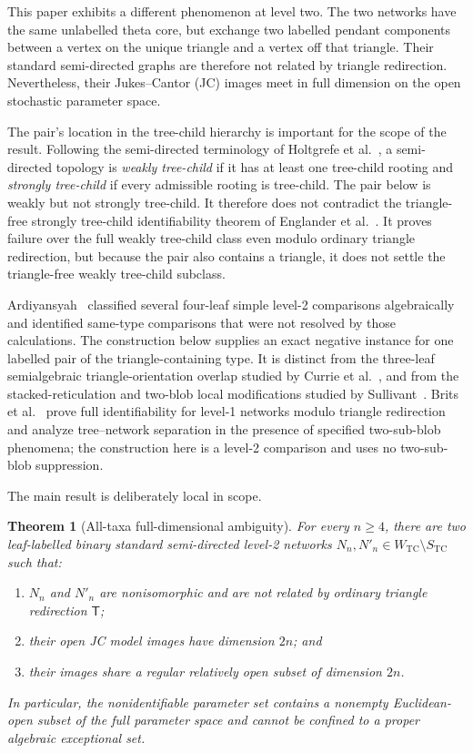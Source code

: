\documentclass[11pt]{article}
\newtheorem{theorem}{Theorem}[section]
\theoremstyle{remark}
\newcommand{\TCw}{W_{\mathrm{TC}}}
\newcommand{\TCs}{S_{\mathrm{TC}}}
\newcommand{\Tmove}{\mathsf T}
\begin{document}
This paper exhibits a different phenomenon at level two.  The two networks
have the same unlabelled theta core, but exchange two labelled pendant
components between a vertex on the unique triangle and a vertex off that
triangle.  Their standard semi-directed graphs are therefore not related by
triangle redirection.  Nevertheless, their Jukes--Cantor (JC) images meet in
full dimension on the open stochastic parameter space.

The pair's location in the tree-child hierarchy is important for the scope of
the result.  Following the semi-directed
terminology of Holtgrefe et al.~\cite{HoltgrefeEtAl2026}, a semi-directed
topology is \emph{weakly tree-child} if it has at least one tree-child rooting
and \emph{strongly tree-child} if every admissible rooting is tree-child.  The
pair below is weakly but not strongly tree-child.  It therefore does not
contradict the triangle-free strongly tree-child identifiability theorem of
Englander et al.~\cite{EnglanderEtAl2026}.  It proves failure over the full
weakly tree-child class even modulo ordinary triangle redirection, but because
the pair also contains a triangle, it does not settle the triangle-free weakly
tree-child subclass.

Ardiyansyah~\cite{Ardiyansyah2021} classified several four-leaf simple
level-2 comparisons algebraically and identified same-type comparisons that
were not resolved by those calculations.  The construction below supplies an
exact negative instance for one labelled pair of the triangle-containing
type.
It is distinct from the three-leaf semialgebraic triangle-orientation overlap
studied by Currie et al.~\cite{CurrieEtAl2026}, and from the
stacked-reticulation and two-blob local modifications studied by
Sullivant~\cite{Sullivant2026}.  Brits et al.~\cite{BritsEtAl2026} prove full
identifiability for level-1 networks modulo triangle redirection and analyze
tree--network separation in the presence of specified two-sub-blob
phenomena; the construction here is a level-2 comparison and uses no
two-sub-blob suppression.

The main result is deliberately local in scope.

\begin{theorem}[All-taxa full-dimensional ambiguity]\label{thm:main}
For every $n\ge4$, there are two leaf-labelled binary standard
semi-directed level-2 networks $N_n,N'_n\in\TCw\setminus\TCs$ such that:
\begin{enumerate}[label=(\roman*)]
  \item $N_n$ and $N'_n$ are nonisomorphic and are not related by ordinary
        triangle redirection $\Tmove$;
  \item their open JC model images have dimension $2n$; and
  \item their images share a regular relatively open subset of dimension
        $2n$.
\end{enumerate}
In particular, the nonidentifiable parameter set contains a nonempty
Euclidean-open subset of the full parameter space and cannot be confined to a
proper algebraic exceptional set.
\end{theorem}
\end{document}
